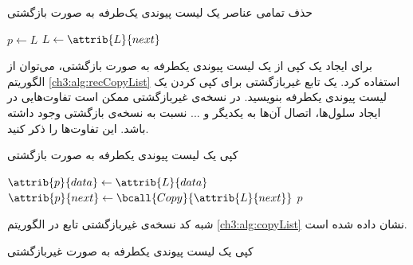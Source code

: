 \begin{algorithm}
\caption{حذف تمامی عناصر یک لیست پیوندی یک‌طرفه به صورت بازگشتی}\label{ch3:alg:modRecMkNull}
\begin{latin}
\begin{algorithmic}[1]
				\State \Return
		\EndIf
		\State	$p \gets L$
		\State	$L \gets \attrib{L}{next}$
		\State	{}			
		\State	{}
\EndProcedure
\end{algorithmic}
\end{latin}
\end{algorithm}

 برای ایجاد یک کپی از یک لیست پیوندی یکطرفه به صورت بازگشتی، می‌توان از الگوریتم {\eqref{ch3:alg:recCopyList}} استفاده کرد. یک تابع غیربازگشتی برای کپی کردن یک لیست پیوندی یکطرفه بنویسید. در نسخه‌ی غیربازگشتی ممکن است تفاوت‌هایی در ایجاد سلول‌ها، اتصال آن‌ها به یکدیگر و ... نسبت به نسخه‌ی بازگشتی وجود داشته باشد. این تفاوت‌ها را ذکر کنید.

\begin{algorithm}
\caption{کپی یک لیست پیوندی یکطرفه به صورت بازگشتی}\label{ch3:alg:recCopyList}
\begin{latin}
\begin{algorithmic}[1]
				\State \Return {}
		\EndIf
		\State	{}
		\State	$\attrib{p}{data} \gets \attrib{L}{data}$
		\State	$\attrib{p}{next} \gets \bcall{Copy}{\attrib{L}{next}}$
		\State	\Return $p$
\EndFunction
\end{algorithmic}
\end{latin}
\end{algorithm}


شبه کد نسخه‌ی غیربازگشتی تابع {} در الگوریتم {\eqref{ch3:alg:copyList}} نشان داده شده است.
\begin{algorithm}
\caption{کپی یک لیست پیوندی یکطرفه به صورت غیربازگشتی}\label{ch3:alg:copyList}
\begin{latin}
\end{latin}
\end{algorithm}

